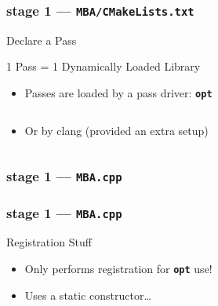 \documentclass[14pt]{beamer}
\newcommand{\Command}[1]{\textbf{\texttt{#1}}}
\begin{document}
    \begin{frame}[containsverbatim]
        \frametitle{stage 1 --- \texttt{MBA/CMakeLists.txt}}
        \begin{block}{Declare a Pass}
            \footnotesize
            
        \end{block}

        \begin{alertblock}{1 Pass = 1 Dynamically Loaded Library}
            \begin{itemize}
                \item Passes are loaded by a pass driver: \textbf{\texttt{opt}}
{
\footnotesize
\begin{lstlisting}[language=bash]
% opt -load LLVMMBA.so -mba foo.ll -S
\end{lstlisting}
}
                \item Or by clang (provided an extra setup)
{
\footnotesize
\begin{lstlisting}[language=bash]
% clang -Xclang -load -Xclang LLVMMBA.so foo.c -c
\end{lstlisting}
}
            \end{itemize}
        \end{alertblock}

    \end{frame}

    \begin{frame}[containsverbatim]
        \frametitle{stage 1 --- \texttt{MBA.cpp}}
        {
            \footnotesize
            
        }
    \end{frame}


    \begin{frame}[containsverbatim]
        \frametitle{stage 1 --- \texttt{MBA.cpp}}
        \begin{alertblock}{Registration Stuff}
            \begin{itemize}
                \item Only performs registration for \Command{opt} use!
                \item Uses a static constructor\dots
            \end{itemize}
        \end{alertblock}
        {
            \footnotesize
            
        }
    \end{frame}
\end{document}
